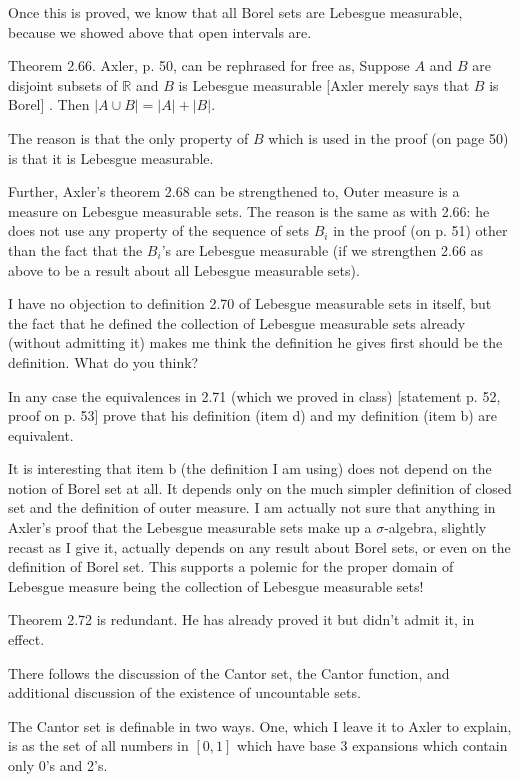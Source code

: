 \documentclass[12pt]{article}
\begin{document}
Once this is proved, we know that all Borel sets are Lebesgue measurable, because we showed above that open intervals are.

Theorem 2.66. Axler, p. 50, can be rephrased for free as, Suppose $A$ and $B$ are disjoint subsets of $\mathbb R$ and $B$ is Lebesgue measurable [Axler merely says that $B$ is Borel] .  Then $|A \cup B| = |A| + |B|$.

The reason is that the only property of $B$ which is used in the proof (on page 50) is that it is Lebesgue measurable.

Further, Axler's theorem 2.68 can be strengthened to,  Outer measure is a measure on Lebesgue measurable sets.  The reason is the same as with 2.66:  he does not use any property of the sequence of sets $B_i$ in the proof (on p. 51) other than the fact that the $B_i$'s are Lebesgue measurable (if we strengthen 2.66 as above to be a result about all Lebesgue measurable sets).

I have no objection to definition 2.70 of Lebesgue measurable sets in itself, but the fact that he defined the collection of Lebesgue measurable sets already (without admitting it) makes me think the definition he gives first should be the definition.  What do you think?

In any case the equivalences in 2.71 (which we proved in class) [statement p. 52, proof on p. 53] prove that his definition (item d) and my definition (item b) are equivalent.  

It is interesting that item b
(the definition I am using) does not depend on the notion of Borel set at all.  It depends only on the much simpler definition of closed set and the definition of outer measure.    I am actually not sure that anything in Axler's proof that the Lebesgue measurable sets make up a $\sigma$-algebra, slightly recast as I give it, actually depends on any result about Borel sets, or even on the definition of Borel set.  This supports a polemic for the proper domain of Lebesgue measure being the collection of Lebesgue measurable sets!

Theorem 2.72 is redundant.  He has already proved it but didn't admit it, in effect.

There follows the discussion of the Cantor set, the Cantor function, and additional discussion of the existence of uncountable sets.

The Cantor set is definable in two ways.  One, which I leave it to Axler to explain, is as the set of all numbers in $[0,1]$ which have base 3 expansions which contain only 0's and 2's.
\end{document}
